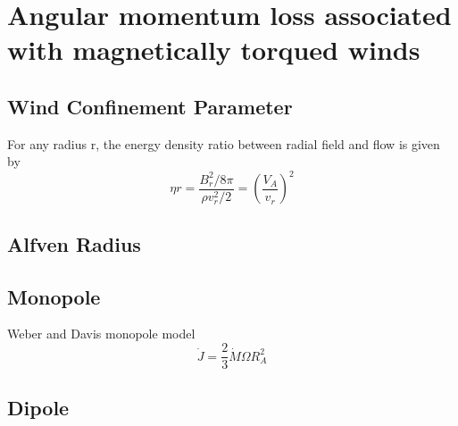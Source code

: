 \section{Angular momentum loss associated with magnetically torqued winds}
\subsection{Wind Confinement Parameter}
For any radius r, the energy density ratio between radial field and flow is given by
\begin{equation}
\eta{r}=\frac{B_r^2/8\pi}{\rho v_r^2/2}=(\frac{V_A}{v_r})^2
\end{equation}

\subsection{Alfven Radius}

\subsection{Monopole}
Weber and Davis monopole model
\begin{equation}
\dot{J}=\frac{2}{3}\dot{M}\Omega R_A^2
\end{equation}
\subsection{Dipole}